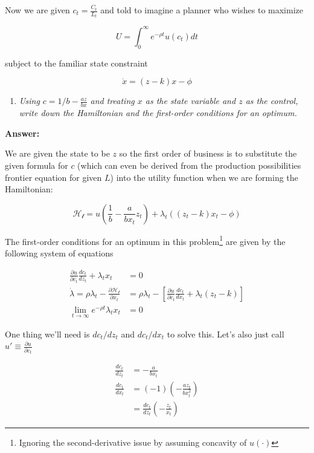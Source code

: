 \documentclass[
]{article}
\providecommand{\tightlist}{%
  \setlength{\itemsep}{0pt}\setlength{\parskip}{0pt}}
\begin{document}
Now we are given \(c_t = \frac{C_t}{L_t}\) and told to imagine a planner
who wishes to maximize

\[U = \int^{\infty}_{0} e^{-\rho t} u(c_t) dt\]

subject to the familiar state constraint

\[ \dot{x} = (z-k)x - \phi\]

\begin{enumerate}
\def\labelenumi{\arabic{enumi}.}
\tightlist
\item
  \emph{Using \(c = 1/b - \frac{az}{bx}\) and treating \(x\) as the
  state variable and \(z\) as the control, write down the Hamiltonian
  and the first-order conditions for an optimum.}
\end{enumerate}

\textbf{Answer:}

We are given the state to be \(z\) so the first order of business is to
substitute the given formula for \(c\) (which can even be derived from
the production possibilities frontier equation for given \(L\)) into the
utility function when we are forming the Hamiltonian:

\[ \mathcal{H_t} = u\left(\frac{1}{b} - \frac{a}{bx_t}z_t \right) + \lambda_t((z_t-k)x_t - \phi)\]

The first-order conditions for an optimum in this problem\footnote{Ignoring
  the second-derivative issue by assuming concavity of \(u(\cdot)\)} are
given by the following system of equations

\begin{align}

\frac{\partial u}{\partial c_t}\frac{d c_t}{d z_t} + \lambda_t x_t &= 0 \\

\dot{\lambda} = \rho \lambda_t - \frac{\partial \mathcal{H_t}}{\partial x_t} &= \rho \lambda_t - \left[\frac{\partial u}{\partial c_t}\frac{d c_t}{d x_t} + \lambda_t (z_t - k) \right] \\

\lim_{t \to \infty} e^{-\rho t}\lambda_t x_t &= 0 

\end{align}

One thing we'll need is \(d c_t/d z_t\) and \(d c_t/d x_t\) to solve
this. Let's also just call \(u' \equiv \frac{\partial u}{\partial c_t}\)

\begin{align}

\frac{d c_t}{d z_t} &= -\frac{a}{bx_t} \\
\frac{d c_t}{d x_t} &= (-1)\left(-\frac{az_t}{bx_t^2}\right)  \\
&= \frac{d c_t}{d z_t}\left(-\frac{z_t}{x_t}\right)

\end{align}
\end{document}
